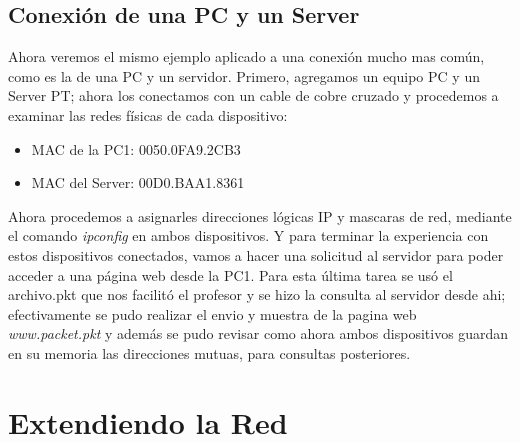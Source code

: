 \documentclass{article}
\begin{document}
\subsection{Conexión de una PC y un Server}

Ahora veremos el mismo ejemplo aplicado a una conexión mucho mas común, como es la de una PC y un servidor. Primero, agregamos un equipo PC y un Server PT; ahora los conectamos con un cable de cobre cruzado y procedemos a examinar las redes físicas de cada dispositivo:

\begin{itemize}
    \item MAC de la PC1: 0050.0FA9.2CB3
    \item MAC del Server: 00D0.BAA1.8361
\end{itemize}

{\setlength{\parindent}{1pt}Ahora procedemos a asignarles direcciones lógicas IP y mascaras de red, mediante el comando \textit{ipconfig} en ambos dispositivos. Y para terminar la experiencia con estos dispositivos conectados, vamos a hacer una solicitud al servidor para poder acceder a una página web desde la PC1. Para esta última tarea se usó el archivo.pkt que nos facilitó el profesor y se hizo la consulta al servidor desde ahi; efectivamente se pudo realizar el envio y muestra de la pagina web \textit{www.packet.pkt} y además se pudo revisar como ahora ambos dispositivos guardan en su memoria las direcciones mutuas, para consultas posteriores.}


\section{Extendiendo la Red}
\end{document}
